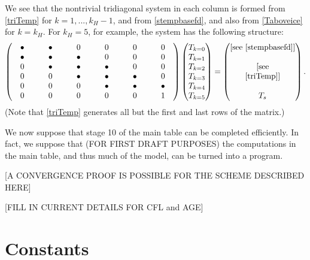 \documentclass{amsart}%
\theoremstyle{plain}
\theoremstyle{definition}
\theoremstyle{remark}
\begin{document}
We see that the nontrivial tridiagonal system in each column is formed from \eqref{triTemp} for $k=1,...,k_H-1$, and from \eqref{stempbasefd}, and also from \eqref{Taboveice} for $k=k_H$.  For $k_H=5$, for example, the system has the following structure:
\newcommand{\bul}{\bullet}
    $$\begin{pmatrix} \quad \bul \quad & \quad \bul \quad & \quad 0 \quad & \quad 0 \quad & \quad 0 \quad & \quad 0 \quad \\ \bul &\bul & \bul & 0 & 0 & 0 \\ 0 & \bul & \bul & \bul & 0 & 0 \\ 0 & 0 & \bul & \bul & \bul & 0 \\ 0 & 0 & 0 & \bul & \bul & \bul \\ 0 & 0 & 0 & 0 & 0 & 1 \end{pmatrix} \begin{pmatrix} T_{k=0} \\ T_{k=1} \\ T_{k=2} \\ T_{k=3} \\ T_{k=4} \\ T_{k=5} \end{pmatrix}  =  \begin{pmatrix} [\text{see \eqref{stempbasefd}}] \\  \\ [\text{see} \\ \eqref{triTemp}] \\  \\ T_s \end{pmatrix}.$$
(Note that \eqref{triTemp} generates all but the first and last rows of the matrix.)

We now suppose that stage 10 of the main table can be completed efficiently.  In fact, we suppose that (FOR FIRST DRAFT PURPOSES) the computations in the main table, and thus much of the model, can be turned into a program.

[A CONVERGENCE PROOF IS POSSIBLE FOR THE SCHEME DESCRIBED HERE]

[FILL IN CURRENT DETAILS FOR CFL and AGE]


\section{Constants}
\end{document}
